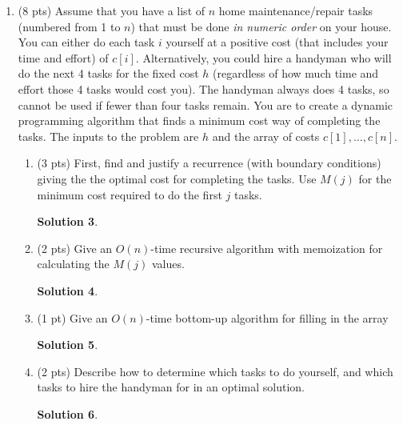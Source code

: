 \documentclass[11pt]{article}
\newtheorem*{solution}{Solution}
\begin{document}
\begin{enumerate}
\begin{enumerate}
\begin{solution}
\end{solution}
\newpage


\item (1 pt) What is the running time of your iterative algorithm as a function of $n$ (use asymptotic notation)?
\end{enumerate}
 
\begin{solution}

\end{solution}
\newpage
\item (8  pts) Assume that you have a list of $n$ home maintenance/repair tasks (numbered from 1 to $n$) that must be done \emph{in numeric order} on your house.  
 You can either do each task $i$ yourself at a positive cost (that includes your time and effort) of $c[i]$.  
 Alternatively, you could hire a handyman who will do the next 4 tasks for the fixed cost $h$ (regardless of how much time and effort those 4 tasks would  cost you).  
 The handyman always does 4 tasks, so cannot be used if fewer than four tasks remain.
You are to create a dynamic programming algorithm that finds a minimum cost way of completing the tasks.
The inputs to the problem are $h$ and the array of costs $c[1], \ldots, c[n]$.

\begin{enumerate}
\item (3 pts) First, find and justify a recurrence (with boundary conditions) giving the the optimal cost for completing the tasks.  Use $M(j)$ for the minimum cost required to do the first $j$ tasks.
\begin{solution}

\end{solution}
\newpage
\item (2 pts) Give an $O(n)$-time recursive algorithm with memoization for calculating the $M(j)$ values.

\begin{solution}

\end{solution}
\newpage

\item (1 pt) Give an $O(n)$-time bottom-up algorithm for filling in the array
\begin{solution}

\end{solution}
\newpage

\item (2 pts) Describe how to determine which tasks to do yourself, and which tasks to hire the handyman for in an optimal solution.
\begin{solution}


\end{solution}
\end{enumerate}
\end{enumerate}
\end{document}
